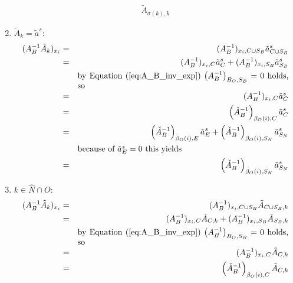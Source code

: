 \documentclass[a4paper]{article}
\begin{document}
\begin{enumerate}
\begin{eqnarray}
  \tilde{A}_{\sigma(k), k}    
\end{eqnarray}
\item $\tilde{A}_{k}=\tilde{a}^{s}$:
\begin{eqnarray}
  (A_{B}^{-1}\tilde{A}_{k})_{x_{i}} &=& 
  (A_{B}^{-1})_{x_{i}, C \cup S_{B}} \tilde{a}_{C \cup S_{B}}^{s}
  \nonumber \\
  &=&
  (A_{B}^{-1})_{x_{i}, C}\tilde{a}_{C}^{s} +
  (A_{B}^{-1})_{x_{i}, S_{B}}\tilde{a}_{S_{B}}^{s} 
  \nonumber \\
  &&\begin{minipage}{9cm}
    by Equation~(\ref{eq:A_B_inv_exp})
    $\left(A_{B}^{-1}\right)_{B_{O}, S_{B}}=0$ holds, so
  \end{minipage}
  \nonumber \\
  &=&
  (A_{B}^{-1})_{x_{i}, C}\tilde{a}_{C}^{s}
  \nonumber \\
  &=&
  \left(\check{A}_{B}^{-1}\right)_{\beta_{O}(i),C}\tilde{a}_{C}^{s} 
  \nonumber \\
  &=&
  \left(\check{A}_{B}^{-1}\right)_{\beta_{O}(i), E}\tilde{a}_{E}^{s}
  +\left(\check{A}_{B}^{-1}\right)_{\beta_{O}(i), S_{N}}\tilde{a}_{S_{N}}^{s}
  \nonumber \\
  &&\begin{minipage}{9cm}
  because of $\tilde{a}^{s}_{E}=0$ this yields
  \end{minipage}
  \nonumber \\
  &=&
  \left(\check{A}_{B}^{-1}\right)_{\beta_{O}(i), S_{N}}\tilde{a}_{S_N}^{s}
\end{eqnarray}
\item $k \in \hat{N} \cap O$:
\begin{eqnarray}
  (A_{B}^{-1}\tilde{A}_{k})_{x_{i}} &=&
  (A_{B}^{-1})_{x_{i}, C \cup S_{B}}\tilde{A}_{C \cup S_{B}, k}
  \nonumber \\
  &=&
  (A_{B}^{-1})_{x_{i}, C}\tilde{A}_{C, k} +
  (A_{B}^{-1})_{x_{i}, S_{B}}\tilde{A}_{S_{B}, k}
  \nonumber \\
  &&\begin{minipage}{9cm}
    by Equation~(\ref{eq:A_B_inv_exp})
    $\left(A_{B}^{-1}\right)_{B_{O}, S_{B}}=0$ holds, so
  \end{minipage}
  \nonumber \\  
  &=&
  (A_{B}^{-1})_{x_{i}, C}\tilde{A}_{C, k}
  \nonumber \\  
  &=&
  \left(\check{A}_{B}^{-1}\right)_{\beta_{O}(i),C}\tilde{A}_{C,k} 
\end{eqnarray}
\end{enumerate}
\end{document}
